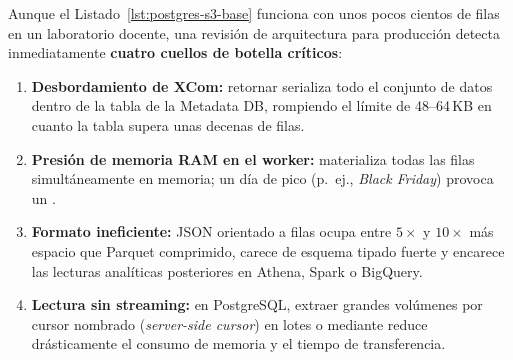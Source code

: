 Aunque el Listado~\ref{lst:postgres-s3-base} funciona con unos pocos cientos de filas en un laboratorio docente, una revisión de arquitectura para producción detecta inmediatamente \textbf{cuatro cuellos de botella críticos}:
\begin{enumerate}
  \item \textbf{Desbordamiento de XCom:} retornar  serializa todo el conjunto de datos dentro de la tabla  de la Metadata DB, rompiendo el límite de 48--64\,KB en cuanto la tabla supera unas decenas de filas.
  \item \textbf{Presión de memoria RAM en el worker:}  materializa todas las filas simultáneamente en memoria; un día de pico (p.~ej., \textit{Black Friday}) provoca un .
  \item \textbf{Formato ineficiente:} JSON orientado a filas ocupa entre $5\times$ y $10\times$ más espacio que Parquet comprimido, carece de esquema tipado fuerte y encarece las lecturas analíticas posteriores en Athena, Spark o BigQuery.
  \item \textbf{Lectura sin streaming:} en PostgreSQL, extraer grandes volúmenes por cursor nombrado (\textit{server-side cursor}) en lotes o mediante  reduce drásticamente el consumo de memoria y el tiempo de transferencia.
\end{enumerate}

